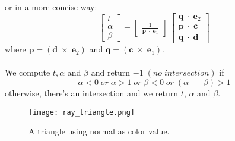 \documentclass[11pt,a4paper]{article}
\begin{document}
	or in a more concise way:
	\[
	\begin{bmatrix}
		t \\
		\alpha \\
		\beta 
	\end{bmatrix} = \left[
	\begin{array}{ccc}
		\frac{1}{\boldsymbol{p}\;\cdot\;\boldsymbol{e}_{1}}
	\end{array}
	\right]
	\
	\begin{bmatrix}
		\boldsymbol{q}\;\cdot\;\boldsymbol{e}_{2} \\
		\boldsymbol{p}\;\cdot\;\boldsymbol{c} \\
		\boldsymbol{q}\;\cdot\;\boldsymbol{d}
	\end{bmatrix}
	\]
	where $\boldsymbol{p}=(\boldsymbol{d}\;\times\;\boldsymbol{e}_{2})$ and $\boldsymbol{q}=(\boldsymbol{c}\;\times\;\boldsymbol{e}_{1})$.\\~\\
	We compute $t, \alpha$ and $\beta$ and return $-1\;(no\;intersection)$ if 
	\begin{equation}
		\alpha<0\;or\;\alpha>1\;or\;\beta<0\;or\;(\alpha\;+\;\beta)>1
	\end{equation}
	otherwise, there's an intersection and we return $t$, $\alpha$ and $\beta$.
	\begin{figure}[htp]
		\centering
		\texttt{[image: ray\_triangle.png]}\quad
		\caption{A triangle using normal as color value.}
	\end{figure}
\end{document}
